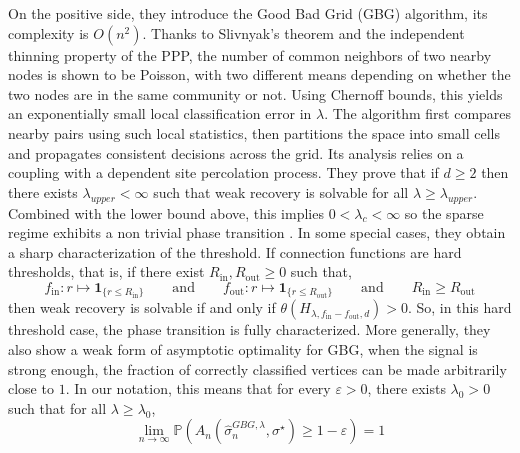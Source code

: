 \documentclass[runningheads]{llncs}
\begin{document}
On the positive side, they introduce the Good Bad Grid (GBG) algorithm, its complexity is \(O(n^2)\). %
Thanks to Slivnyak's theorem and the independent thinning property of the PPP, the number of common neighbors of two nearby nodes is shown to be Poisson, with two different means depending on whether the two nodes are in the same community or not. Using Chernoff bounds, this yields an exponentially small local classification error in \(\lambda\). The algorithm first compares nearby pairs using such local statistics, then partitions the space into small cells and propagates consistent decisions across the grid. 
Its analysis relies on a coupling with a dependent site percolation process. They prove that if \(d\ge 2\) then there exists \(\lambda_{upper}<\infty\) such that weak recovery is solvable for all \(\lambda\ge \lambda_{upper}\). Combined with the lower bound above, this implies
\(0<\lambda_c<\infty\) so the sparse regime exhibits a non trivial phase transition \citep{abbe2021community}.
In some special cases, they obtain a sharp characterization of the threshold. If connection functions are hard thresholds, that is, if there exist \(R_\mathrm{in}, R_\mathrm{out} \geq 0\) such that,
\[
f_\mathrm{in}: r \mapsto \mathbf{1}_{\{r\le R_\mathrm{in}\}}
\qquad\text{and}\qquad
f_\mathrm{out}: r \mapsto \mathbf{1}_{\{r\le R_\mathrm{out}\}}
\qquad\text{and}\qquad
R_\mathrm{in}\ge R_\mathrm{out}
\]
then weak recovery is solvable if and only if \(\theta(H_{\lambda,f_\mathrm{in}-f_\mathrm{out},d})>0\).
So, in this hard threshold case, the phase transition is fully characterized. More generally, they also show a weak form of asymptotic optimality for GBG, when the signal is strong enough, the fraction of correctly classified vertices can be made arbitrarily close to \(1\). In our notation, this means that for every \(\varepsilon>0\), there exists \(\lambda_0>0\) such that for all \(\lambda\ge \lambda_0\),
\[
\lim_{n\to\infty}\mathbb P\!\left(
A_n(\hat{\sigma}^{GBG, \lambda}_n,\sigma^\star)\ge 1-\varepsilon
\right)=1
\]

\end{document}
